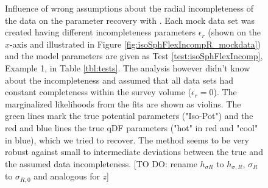 \addtocounter{figure}{-1}
\begin{figure} [t!]
\caption{Influence of wrong assumptions about the radial incompleteness of the data on the parameter recovery with \RM. Each mock data set was created having different incompleteness parameters $\epsilon_r$ (shown on the $x$-axis and illustrated in Figure \ref{fig:isoSphFlexIncompR_mockdata}) and the model parameters are given as Test \ref{test:isoSphFlexIncomp}, Example 1, in Table \ref{tbl:tests}. The analysis however didn't know about the incompleteness and assumed that all data sets had constant completeness within the survey volume ($\epsilon_r = 0$). The marginalized likelihoods from the fits are shown as violins. The green lines mark the true potential parameters ("Iso-Pot") and the red and blue lines the true qDF parameters ("hot" \MAP in red and "cool" \MAP in blue), which we tried to recover. The \RM method seems to be very robust against small to intermediate deviations between the true and the assumed data incompleteness. [TO DO: rename $h_{\sigma R}$ to $h_{\sigma,R}$, $\sigma_R$ to $\sigma_{R,0}$ and analogous for $z$]} 
\label{fig:isoSphFlexIncompR_violins}
\end{figure}

